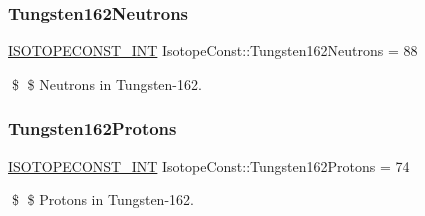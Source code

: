 \subsubsection{\texorpdfstring{Tungsten162\+Neutrons}{Tungsten162Neutrons}}
{\footnotesize\ttfamily \mbox{\hyperlink{group___isotope_const-_macros_ga5f18360b3e99483a35c32d789e62621c}{I\+S\+O\+T\+O\+P\+E\+C\+O\+N\+S\+T\+\_\+\+I\+NT}} Isotope\+Const\+::\+Tungsten162\+Neutrons = 88}

\$ \$ Neutrons in Tungsten-\/162. \mbox{\label{group___isotope_const-_tungsten-_w162_gae87fb5990e28e55c3d30fbe3b02aaa25}} 
\subsubsection{\texorpdfstring{Tungsten162\+Protons}{Tungsten162Protons}}
{\footnotesize\ttfamily \mbox{\hyperlink{group___isotope_const-_macros_ga5f18360b3e99483a35c32d789e62621c}{I\+S\+O\+T\+O\+P\+E\+C\+O\+N\+S\+T\+\_\+\+I\+NT}} Isotope\+Const\+::\+Tungsten162\+Protons = 74}

\$ \$ Protons in Tungsten-\/162. 